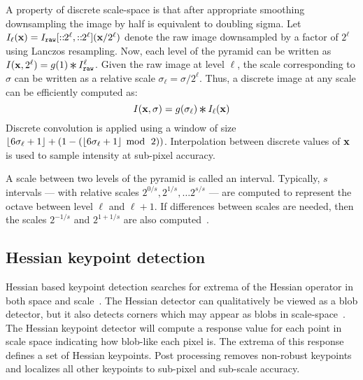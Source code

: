            A property of discrete scale-space is that after appropriate smoothing downsampling the image by half
            is equivalent to doubling sigma. Let
            $I_\ell(\mathbf{x}) = I_{\tt{raw}}[::\mkern-6mu2^{\ell},::\mkern-6mu2^{\ell}]({\mathbf{x}} / {2^{\ell}})$ 
            denote the raw image downsampled by a factor of $2^{\ell}$ using Lanczos resampling. Now, each level of
            the pyramid can be written as %
            $\img(\pt, 2^\ell) = g( 1 ) \conv \rawimg^\ell$. Given the raw image at level $\ell$, the scale
            corresponding to $\sigma$ can be written as a relative scale
            $\sigma_\ell = \sigma / 2^\ell$.
            Thus, a discrete image at any scale can be efficiently computed as:
            \begin{equation}
                \img(\pt, \sigma) =
                    g(\sigma_\ell) \conv \img_\ell(\pt)
            \end{equation}
            Discrete convolution is applied using a window of size
              $\left\lfloor{} 6\sigma_\ell + 1 \right\rfloor + (1 -
              (\left\lfloor{} 6\sigma_\ell + 1 \right\rfloor\; \operatorname{mod}{} \;\,2))$.
            Interpolation between discrete values of $\mathbf{x}$ is used to
              sample intensity at sub-pixel accuracy.

            A scale between two levels of the pyramid is called an interval. Typically, $s$ intervals --- with
            relative scales $2^{0/s}, 2^{1/s}, \ldots 2^{s/s}$ --- are computed to represent the octave between
            level $\ell$ and $\ell + 1$. If differences between scales are needed, then the scales $2^{-1/s}$ and
            $2^{1 + 1/s}$ are also computed~\cite{lowe_distinctive_2004}.

    \subsection{Hessian keypoint detection}

        Hessian based keypoint detection searches for extrema of the Hessian operator in both space and
        scale~\cite{beaudet_rotationally_1978, lindeberg_shape_adapted_1994}. The Hessian detector can
        qualitatively be viewed as a blob detector, but it also detects corners which may appear as blobs in
        scale-space~\cite{tuytelaars_local_2007}. The Hessian keypoint detector will compute a response value for
        each point in scale space indicating how blob-like each pixel is. The extrema of this response defines a
        set of Hessian keypoints. Post processing removes non-robust keypoints and localizes all other keypoints to
        sub-pixel and sub-scale accuracy.

